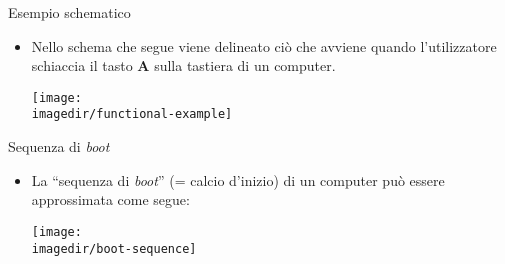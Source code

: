 %
%
%
%
%
\setcounter{ms}{1}
\begin{slide}{Esempio schematico}
{

	\begin{itemize}
	
		\item Nello schema che segue viene delineato
			  ci\`o che avviene quando l'utilizzatore
              schiaccia il tasto {\bfseries A} sulla tastiera
              di un computer.

			  \begin{center}
				\texttt{[image: \\imagedir/functional-example]}
			  \end{center}

	\end{itemize}
}
\end{slide}


\begin{slide}{Sequenza di \emph{boot}}
{

	\begin{itemize}
	
		\item La ``sequenza di \emph{boot}'' (= calcio d'inizio)
			  di un computer pu\`o essere approssimata come segue:

			  \begin{center}
				\texttt{[image: \\imagedir/boot-sequence]}
			  \end{center}

	\end{itemize}
}
\end{slide}
